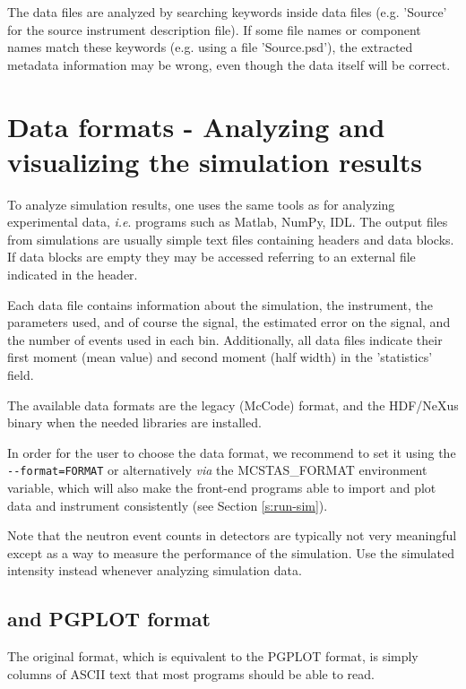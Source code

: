 The data files are analyzed by searching keywords inside data files
(e.g. 'Source' for the source instrument description file). If some file names or
component names match these keywords (e.g. using a file 'Source.psd'), the
extracted metadata information may be wrong, even though the data itself will be
correct.

\section{Data formats - Analyzing and visualizing the simulation results}
\label{s:analyze}

To analyze simulation results, one uses the same tools as for analyzing
experimental data, \textit{i.e}. programs such as Matlab, NumPy, IDL.  The
output files from simulations are usually simple text files containing headers
and data blocks. If data blocks are empty they may be accessed referring to an
external file indicated in the header.

Each data file contains information about the simulation, the instrument, the
parameters used, and of course the signal, the estimated error on the signal,
and the number of events used in each bin. Additionally, all data files indicate
their first moment (mean value) and second moment (half width) in the
'statistics' field.

The available data formats are the legacy \MCS (McCode) format, and the HDF/NeXus binary when the needed libraries are installed.

In order for the user to choose the data format, we recommend to set it using
the \verb+--format=FORMAT+ or alternatively \textit{via} the MCSTAS\_FORMAT
environment variable, which will also make the front-end programs able to import
and plot data and instrument consistently (see Section \ref{s:run-sim}). 

Note that the neutron event counts in detectors are typically not very
meaningful except as a way to measure the performance of the
simulation. Use the simulated intensity instead whenever analyzing
simulation data.

\subsection{\MCS and PGPLOT format}
The \MCS original format, which is
equivalent to the PGPLOT format, is simply columns of ASCII text that most
programs should be able to read.

